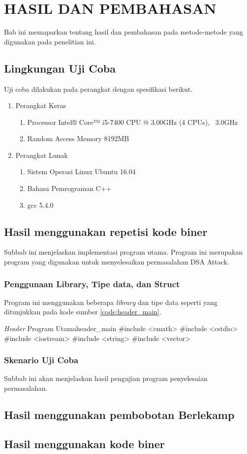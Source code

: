 \chapter{HASIL DAN PEMBAHASAN}

Bab ini memaparkan tentang hasil dan pembahasan pada metode-metode yang digunakan pada penelitian ini.

\section{Lingkungan Uji Coba}

Uji coba dilakukan pada perangkat dengan spesifikasi berikut.
\begin{enumerate}
  \item Perangkat Keras
  \begin{enumerate}
    \item Processor Intel® Core™ i5-7400 CPU @ 3.00GHz (4 CPUs), ~3.0GHz
    \item Random Access Memory 8192MB
  \end{enumerate}
  \item Perangkat Lunak
  \begin{enumerate}
    \item Sistem Operasi Linux Ubuntu 16.04
    \item Bahasa Pemrograman C++
    \item gcc 5.4.0
  \end{enumerate}
\end{enumerate}

\section{Hasil menggunakan repetisi kode biner}

Subbab ini menjelaskan implementasi program utama. Program ini merupakan program yang digunakan untuk menyelesaikan permasalahan DSA Attack.

\subsection{Penggunaan Library, Tipe data, dan Struct}

Program ini menggunakan beberapa \textit{library} dan tipe data seperti yang ditunjukkan pada kode sumber \ref{code:header_main}.

\begin{code}[firstnumber=1,float]{\textit{Header} Program Utama}{header_main}
#include <cmath>
#include <cstdio>
#include <iostream>
#include <string>
#include <vector>
\end{code}

\subsection{Skenario Uji Coba}

Subbab ini akan menjelaskan hasil pengujian program penyelesaian permasalahan.

\section{Hasil menggunakan pembobotan Berlekamp}

\section{Hasil menggunakan kode biner}
